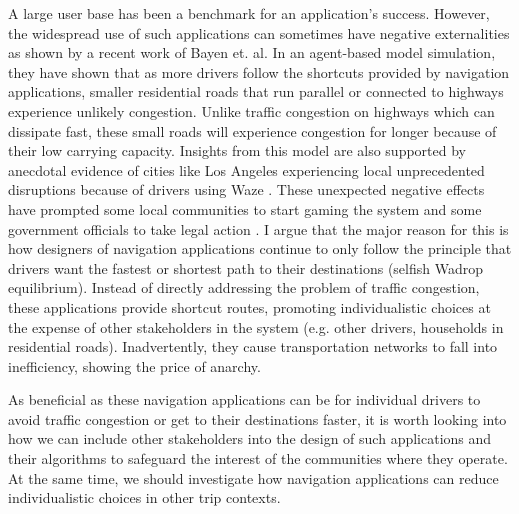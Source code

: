 A large user base has been a benchmark for an application's success. However, the widespread use of such applications can sometimes have negative externalities as shown by a recent work of Bayen et. al. In an agent-based model simulation, they have shown that as more drivers follow the shortcuts provided by navigation applications, smaller residential roads that run parallel or connected to highways experience unlikely congestion. Unlike traffic congestion on highways which can dissipate fast, these small roads will experience congestion for longer because of their low carrying capacity\cite{Thai2016NegativeApproach}. Insights from this model are also supported by anecdotal evidence of cities like Los Angeles experiencing local unprecedented disruptions because of drivers using Waze \cite{Battelle2016TheShift, Thornton2015HowTimes, Wirtschafter2017DrivingKALW}. These unexpected negative effects have prompted some local communities to start gaming the system \cite{Weise2017WazeAlgorithms} and some government officials to take legal action \cite{Farivar2018LATechnica}. I argue that the major reason for this is how designers of navigation applications continue to only follow the principle that drivers want the fastest or shortest path to their destinations (selfish Wadrop equilibrium\cite{wardrop1952road}). Instead of directly addressing the problem of traffic congestion, these applications provide shortcut routes, promoting individualistic choices at the expense of other stakeholders in the system (e.g. other drivers, households in residential roads). Inadvertently, they cause transportation networks to fall into inefficiency, showing the price of anarchy\cite{wardrop1952road}. 

As beneficial as these navigation applications can be for individual drivers to avoid traffic congestion or get to their destinations faster, it is worth looking into how we can include other stakeholders into the design of such applications and their algorithms to safeguard the interest of the communities where they operate. At the same time, we should investigate how navigation applications can reduce individualistic choices in other trip contexts. 

